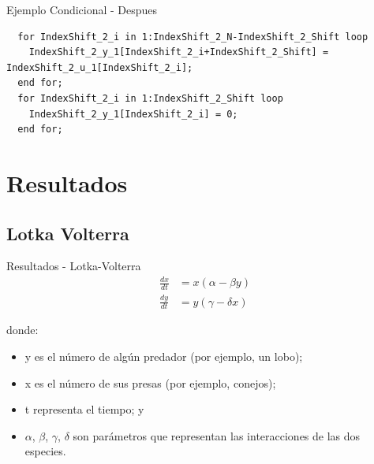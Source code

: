 \documentclass[10pt,handout]{beamer}
\begin{document}
\begin{frame}[fragile]{Ejemplo Condicional - Despues}
\begin{verbatim}
  for IndexShift_2_i in 1:IndexShift_2_N-IndexShift_2_Shift loop
    IndexShift_2_y_1[IndexShift_2_i+IndexShift_2_Shift] = IndexShift_2_u_1[IndexShift_2_i];
  end for;
  for IndexShift_2_i in 1:IndexShift_2_Shift loop
    IndexShift_2_y_1[IndexShift_2_i] = 0;
  end for;
\end{verbatim}
\end{frame}

\section{Resultados}
	\subsection{Lotka Volterra}
\begin{frame}{Resultados - Lotka-Volterra}
\begin{align*}
\frac{dx}{dt} & = x(\alpha - \beta y)\\
\frac{dy}{dt} & =y(\gamma - \delta  x)
\end{align*}

donde:
\begin{itemize}
    \item y es el número de algún predador (por ejemplo, un lobo);
    \item x es el número de sus presas (por ejemplo, conejos);
    \item t representa el tiempo; y
    \item $\alpha$, $\beta$, $\gamma$, $\delta$ son parámetros que representan las interacciones de las dos especies.
\end{itemize}
\end{frame}
\end{document}
